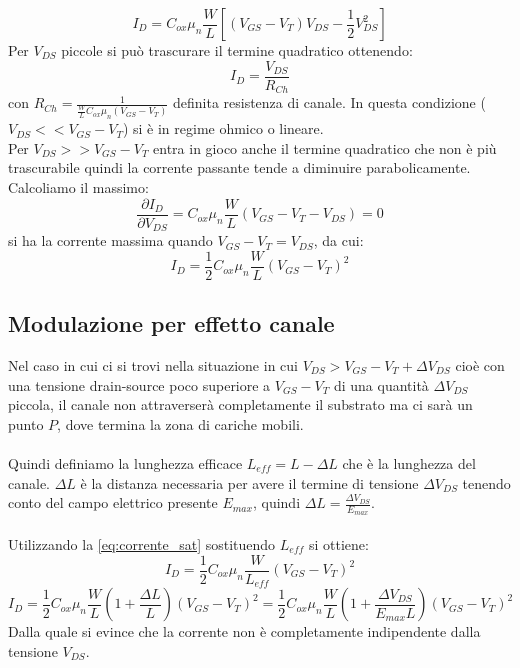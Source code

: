 \documentclass{article}
\begin{document}
\begin{equation}	\label{eq:corrente_ch}
I_D = C_{ox} \mu_n \frac{W}{L} \left[ (V_{GS} - V_T)V_{DS} - \frac{1}{2}V_{DS}^2 \right]
\end{equation}
Per $V_{DS}$ piccole si può trascurare il termine quadratico ottenendo:
\begin{equation*}
I_D = \frac{V_{DS}}{R_{Ch}}
\end{equation*}
con $R_{Ch} = \frac{1}{\frac{W}{L} C_{ox} \mu_n (V_{GS} - V_T)}$  definita resistenza di canale. In questa condizione ($V_{DS} << V_{GS} - V_T$) si è in regime ohmico o lineare.\\
Per $V_{DS} >> V_{GS} - V_T$ entra in gioco anche il termine quadratico che non è più trascurabile quindi la corrente passante tende a diminuire parabolicamente. Calcoliamo il massimo:
\begin{equation*}
\frac{\partial I_D}{ \partial V_{DS}} = C_{ox} \mu_n \frac{W}{L} (V_{GS} - V_T - V_{DS}) = 0
\end{equation*}
si ha la corrente massima quando $V_{GS} - V_T = V_{DS}$, da cui:
\begin{equation}	\label{eq:corrente_sat}
I_D = \frac{1}{2} C_{ox} \mu_n \frac{W}{L} (V_{GS} - V_T)^2
\end{equation}


\subsection*{Modulazione per effetto canale}
Nel caso in cui ci si trovi nella situazione in cui $V_{DS} > V_{GS} - V_T + \Delta V_{DS}$ cioè con una tensione drain-source poco superiore a $V_{GS} - V_T$ di una quantità $\Delta V_{DS}$ piccola, il canale non attraverserà completamente il substrato ma ci sarà un punto $P$, dove termina la zona di cariche mobili.\\
\\
Quindi definiamo la lunghezza efficace $L_{eff} = L - \Delta L$ che è la lunghezza del canale. $\Delta L$ è la distanza necessaria per avere il termine di tensione $\Delta V_{DS}$ tenendo conto del campo elettrico presente $E_{max}$, quindi $\Delta L = \frac{\Delta V_{DS}}{E_{max}}$.\\
\\
Utilizzando la \eqref{eq:corrente_sat} sostituendo $L_{eff}$ si ottiene:
\begin{equation*}
I_D = \frac{1}{2} C_{ox} \mu_n \frac{W}{L_{eff}} (V_{GS} - V_T)^2
\end{equation*}
\begin{equation*}
I_D = \frac{1}{2} C_{ox} \mu_n \frac{W}{L} \left(1+\frac{\Delta L}{L} \right) (V_{GS} - V_T)^2 = \frac{1}{2} C_{ox} \mu_n \frac{W}{L} \left(1+\frac{\Delta V_{DS}}{E_{max} L} \right) (V_{GS} - V_T)^2
\end{equation*}
Dalla quale si evince che la corrente non è completamente indipendente dalla tensione $V_{DS}$.
\end{document}
